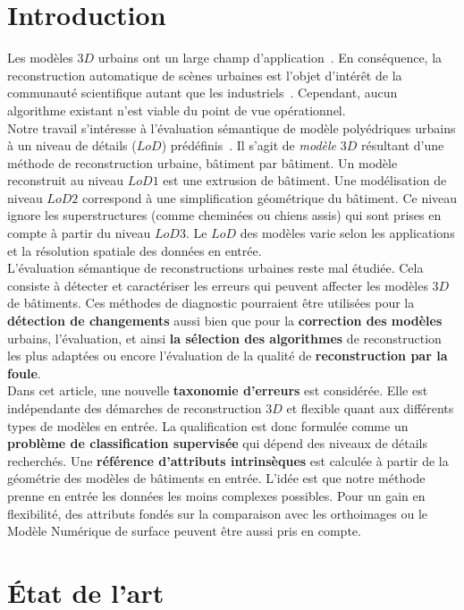 \documentclass[a4paper,french]{article}
\begin{document}
    \section{Introduction}
    Les modèles $3D$ urbains ont un large champ d'application~\cite{Biljecki2015}. En conséquence, la reconstruction automatique de scènes urbaines est l'objet d'intérêt de la communauté scientifique autant que les industriels~\cite{Musialski2012}. Cependant, aucun algorithme existant n'est viable du point de vue opérationnel.\\
    Notre travail s'intéresse à l'évaluation sémantique de modèle polyédriques urbains à un niveau de détails ($LoD$) prédéfinis~\cite{kolbe2005citygml}. Il s'agit de \textit{modèle} $3D$ résultant d'une méthode de reconstruction urbaine, bâtiment par bâtiment. Un modèle reconstruit au niveau $LoD 1$ est une extrusion de bâtiment. Une modélisation de niveau $LoD 2$ correspond à une simplification géométrique du bâtiment. Ce niveau ignore les superstructures (comme cheminées ou chiens assis) qui sont prises en compte à partir du niveau $LoD 3$. Le $LoD$ des modèles varie selon les applications et la résolution spatiale des données en entrée.\\
    L'évaluation sémantique de reconstructions urbaines reste mal étudiée. Cela consiste à détecter et caractériser les erreurs qui peuvent affecter les modèles $3D$ de bâtiments. Ces méthodes de diagnostic pourraient être utilisées pour la \textbf{détection de changements} aussi bien que pour la \textbf{correction des modèles} urbains, l'évaluation, et ainsi \textbf{la sélection des algorithmes} de reconstruction les plus adaptées ou encore l'évaluation de la qualité de \textbf{reconstruction par la foule}.\\
    Dans cet article, une nouvelle \textbf{taxonomie d'erreurs} est considérée. Elle est indépendante des démarches de reconstruction $3D$ et flexible quant aux différents types de modèles en entrée. La qualification est donc formulée comme un \textbf{problème de classification supervisée} qui dépend des niveaux de détails recherchés. Une \textbf{référence d'attributs intrinsèques} est calculée à partir de la géométrie des modèles de bâtiments en entrée. L'idée est que notre méthode prenne en entrée les données les moins complexes possibles. Pour un gain en flexibilité, des attributs fondés sur la comparaison avec les orthoimages ou le Modèle Numérique de surface peuvent être aussi pris en compte.

    \section{\'Etat de l'art}
\end{document}
